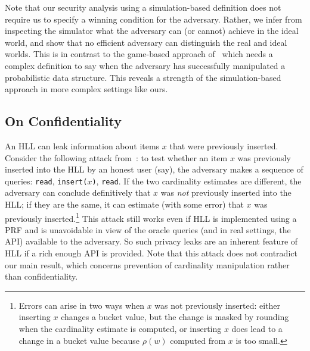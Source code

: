 \documentclass[sigconf, anonymous, dvipsnames]{acmart} %
\begin{document}

Note that our security analysis using a simulation-based definition does not require us to specify a winning condition for the adversary. Rather, we infer from inspecting the simulator what the adversary can (or cannot) achieve in the ideal world, and show that no efficient adversary can distinguish the real and ideal worlds. This is in contrast to the game-based approach of~\cite{CCS:ClaPatShrPS19} which needs a complex definition to say when the adversary has successfully manipulated a probabilistic data structure. This reveals a strength of the simulation-based approach in more complex settings like ours.

\subsection{On Confidentiality}

An HLL can leak information about items $x$ that were previously inserted. Consider the following attack from~\cite{cardestprivacy}: to test whether an item $x$ was previously inserted into the HLL by an honest user (say), the adversary makes a sequence of queries: \texttt{read}, \texttt{insert($x$)}, \texttt{read}. If the two cardinality estimates are different, the adversary can conclude definitively that $x$ was \emph{not} previously inserted into the HLL; if they are the same, it can estimate (with some error) that $x$ was previously inserted.\footnote{Errors can arise in two ways when $x$ was not previously inserted: either inserting $x$ changes a bucket value, but the change is masked by rounding when the cardinality estimate is computed, or inserting $x$ does lead to a change in a bucket value because $\rho(w)$ computed from $x$ is too small.} This attack still works even if HLL is implemented using a PRF and is unavoidable in view of the oracle queries (and in real settings, the API) available to the adversary. So such privacy leaks are an inherent feature of HLL if a rich enough API is provided. Note that this attack does not contradict our main result, which concerns prevention of cardinality manipulation rather than confidentiality. 
\end{document}
